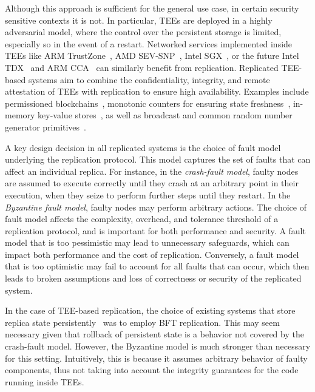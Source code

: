 Although this approach is sufficient for the general use case, in
certain security sensitive contexts it is not. In particular,
\acp{TEE} are deployed in a highly adversarial model, where the
control over the persistent storage is limited, especially so in
the event of a restart. Networked services implemented inside \acp{TEE} like ARM TrustZone~\cite{armTZ}, AMD SEV-SNP~\cite{amdsev,
  amdsev-snp}, Intel SGX~\cite{intelsgx}, or the future Intel
TDX~\cite{inteltdx} and ARM CCA~\cite{arm-cca} can similarly benefit
from replication.  Replicated \ac{TEE}-based systems aim to combine the
confidentiality, integrity, and remote attestation of \acp{TEE} with
replication to ensure high availability.  Examples include permissioned blockchains~\cite{teechain}, monotonic
counters for ensuring state freshness~\cite{rote}, in-memory key-value
stores~\cite{avocado-atc21}, as well as broadcast and common random
number generator primitives~\cite{p2p-sgx}.

A key design decision in all replicated systems is the choice of fault
model underlying the replication protocol. This model captures the set
of faults that can affect an individual replica.  For instance, in the
{\em crash-fault model}, faulty nodes are assumed to execute correctly
until they crash at an arbitrary point in their execution, when they
seize to perform further steps until they restart. In the {\em
  Byzantine fault model}, faulty nodes may perform arbitrary
actions. The choice of fault model affects the complexity, overhead,
and tolerance threshold of a replication protocol, and is important
for both performance and security. A fault model that is too
pessimistic may lead to unnecessary safeguards, which can impact both
performance and the cost of replication. Conversely, a fault model
that is too optimistic may fail to account for all faults that can
occur, which then leads to broken assumptions and loss of correctness
or security of the replicated system.

In the case of \ac{TEE}-based replication, the choice of existing systems
that store replica state persistently~\cite{teechain,rote} was to
employ \ac{BFT} replication. This may seem
necessary given that rollback of persistent state is a behavior not
covered by the crash-fault model.  However, the Byzantine model is
much stronger than necessary for this setting. Intuitively, this
is because it assumes arbitrary behavior of
faulty components, thus not taking into account the integrity
guarantees for the code running inside \acp{TEE}.

